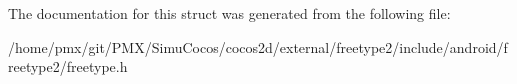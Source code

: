 The documentation for this struct was generated from the following file\+:\begin{DoxyCompactItemize}
\item 
/home/pmx/git/\+P\+M\+X/\+Simu\+Cocos/cocos2d/external/freetype2/include/android/freetype2/freetype.\+h\end{DoxyCompactItemize}
